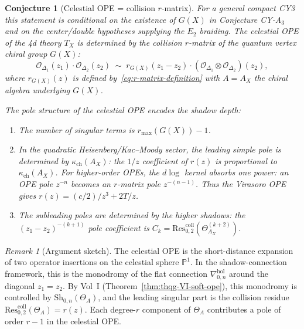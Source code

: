 \documentclass[11pt]{article}
\newtheorem{conjecture}[theorem]{Conjecture}
\theoremstyle{definition}
\theoremstyle{remark}
\newtheorem{remark}[theorem]{Remark}
\newcommand{\cO}{\mathcal{O}}
\newcommand{\Res}{\mathrm{Res}}
\newcommand{\Sh}{\mathrm{Sh}}
\begin{document}
\begin{conjecture}[Celestial OPE = collision $r$-matrix]
\label{conj:celestial-ope-r-matrix}
For a general compact CY3 this statement is conditional on the
existence of $G(X)$ in Conjecture CY-A$_3$ and on the center/double
hypotheses supplying the $E_2$ braiding.
The celestial OPE of the 4d theory $T_X$ is determined by the
collision $r$-matrix of the quantum vertex chiral group $G(X)$:
\begin{equation}\label{eq:celestial-ope}
\cO_{\Delta_1}(z_1) \cdot \cO_{\Delta_2}(z_2)
\;\sim\;
r_{G(X)}(z_1 - z_2) \cdot
(\cO_{\Delta_1} \otimes \cO_{\Delta_2})(z_2),
\end{equation}
where $r_{G(X)}(z)$ is defined by~\eqref{eq:r-matrix-definition}
with $A = A_X$ the chiral algebra underlying $G(X)$.

The pole structure of the celestial OPE encodes the shadow depth:
\begin{enumerate}[label=(\roman*)]
\item The number of singular terms is $r_{\max}(G(X)) - 1$.
\item In the quadratic Heisenberg/Kac--Moody sector, the leading
 \emph{simple} pole is determined by $\kappa_{\mathrm{ch}}(A_X)$: the
 $1/z$ coefficient of $r(z)$ is proportional to
 $\kappa_{\mathrm{ch}}(A_X)$. For higher-order OPEs, the $d\log$ kernel
 absorbs one power: an OPE pole $z^{-n}$ becomes an $r$-matrix pole
 $z^{-(n-1)}$. Thus the Virasoro OPE gives
 $r(z)=(c/2)/z^3+2T/z$.
\item The subleading poles are determined by the higher shadows:
 the $(z_1 - z_2)^{-(k+1)}$ pole coefficient is
 $C_k = \Res^{\mathrm{coll}}_{0,2}(\Theta_{A_X}^{(k+2)})$.
\end{enumerate}
\end{conjecture}

\begin{remark}[Argument sketch]
The celestial OPE is the short-distance expansion of two operator
insertions on the celestial sphere $\mathbb{P}^1$. In the
shadow-connection framework, this is the monodromy of the flat
connection $\nabla^{\mathrm{hol}}_{0,n}$ around the diagonal
$z_1 = z_2$. By Vol~I (Theorem~\ref*{thm:thqg-VI-soft-ope}),
this monodromy is controlled by $\Sh_{0,n}(\Theta_A)$, and the
leading singular part is the collision residue
$\Res^{\mathrm{coll}}_{0,2}(\Theta_A) = r(z)$. Each degree-$r$
component of $\Theta_A$ contributes a pole of order $r-1$ in the
celestial OPE.
\end{remark}
\end{document}
